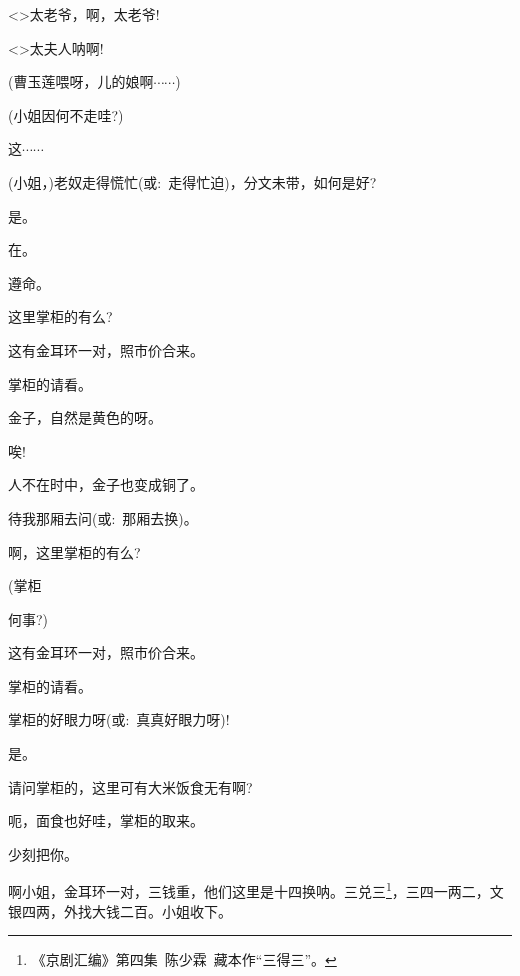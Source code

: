 {{ }

{\textless{}\!\textgreater{}太老爷，啊，太老爷!}


{ }

{\textless{}\!\textgreater{}太夫人{\footnotesize 呐}啊!}

{(曹玉莲\hspace{20pt}喂呀，儿的娘啊$\cdots{}\cdots{}$)}


{(小姐因何不走哇?)}

{这$\cdots{}\cdots{}$}

{(小姐，)老奴走得慌忙({\akai 或}:~走得忙迫)，分文未带，如何是好?}

{是。}

{在。}

{遵命。}

{这里掌柜的有么?}

{这有金耳环一对，照市价合来。}

{掌柜的请看。}

{金子，自然是黄色的呀。}

{唉!

人不在时中，金子也变成铜了。}

{待我那厢去问({\akai 或}:~那厢去换)。}

{啊，这里掌柜的有么?}

{(掌柜

何事?)}

{这有金耳环一对，照市价合来。}

{掌柜的请看。}

{掌柜的好眼力呀({\akai 或}:~真真好眼力呀)!}

{是。}

{请问掌柜的，这里可有大米饭食无有{\footnotesize 啊}?}

{呃，面食也好哇，掌柜的取来。}

{少刻把你。}

{啊小姐，金耳环一对，三钱重，他们这里是十四换呐。三兑三}\footnote{《京剧汇编》第四集~陈少霖~藏本作``三得三''。}{，三四一两二，文银四两，外找大钱二百。小姐收下。}

}

